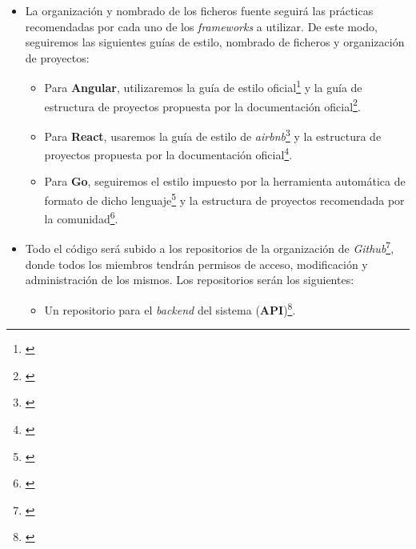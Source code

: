 \documentclass[11pt, a4paper, titlepage]{article}
\begin{document}
\begin{itemize}
    \item La organización y nombrado de los ficheros fuente seguirá las prácticas recomendadas por cada uno de los \textit{frameworks} a utilizar. De este modo, seguiremos las siguientes guías de estilo, nombrado de ficheros y organización de proyectos:
    \begin{itemize}
        \item Para \textbf{Angular}, utilizaremos la guía de estilo oficial\footnote{\href{https://angular.io/guide/styleguide}{\color{blue}{Guía de estilo oficial de Angular}}} y la guía de estructura de proyectos propuesta por la documentación oficial\footnote{\href{https://angular.io/guide/file-structure}{\color{blue}{Guía de estructura de proyectos oficial de Angular}}}.

        \item Para \textbf{React}, usaremos la
        guía de estilo de \textit{airbnb}\footnote{\href{https://airbnb.io/javascript/react/}{\color{blue}{Guía de estilo de React y Javascript de Airbnb}}} y la estructura de proyectos propuesta por la documentación oficial\footnote{\href{https://es.reactjs.org/docs/faq-structure.html}{\color{blue}{Guía de estructura de proyectos oficial de React}}}.

        \item Para \textbf{Go}, seguiremos el estilo impuesto por la herramienta automática de formato de dicho lenguaje\footnote{\href{https://pkg.go.dev/cmd/gofmt}{\color{blue}{Herramienta de formato y estilo oficial de golang}}} y la estructura de proyectos recomendada por la comunidad\footnote{\href{https://github.com/golang-standards/project-layout}{\color{blue}{Guía de estructura de proyectos recomendada para golang por la comunidad}}}.
    \end{itemize}

    \item Todo el código será subido a los repositorios de la organización de \textit{Github}\footnote{\href{https://github.com/UNIZAR-30226-2022-01}{}}, donde todos los miembros tendrán permisos de acceso, modificación y administración de los mismos. Los repositorios serán los siguientes:
    \begin{itemize}
        \item Un repositorio para el \textit{backend} del sistema (\textbf{API})\footnote{\href{https://github.com/UNIZAR-30226-2022-01/proyecto_software_backend}{}}.


\end{itemize}
\end{itemize}
\end{document}
